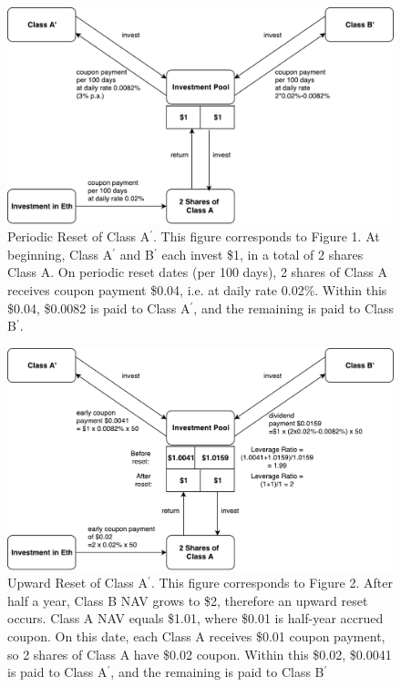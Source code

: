 \documentclass[10pt]{amsart}
\begin{document}
\begin{figure}
\includegraphics[width=\textwidth]{Ap_periodic.pdf}
\caption{Periodic Reset of Class A$^\prime$. This figure corresponds to Figure 1. At beginning, Class A$^\prime$ and B$^\prime$ each invest \$1, in a total of 2 shares Class A. On periodic reset dates (per 100 days), 2 shares of Class A receives coupon payment \$0.04, i.e. at daily rate 0.02\%. Within this \$0.04, \$0.0082 is paid to Class A$^\prime$, and the remaining is paid to Class B$^\prime$.}
\end{figure}

\begin{figure}
\includegraphics[width=\textwidth]{Ap_upward.pdf}
\caption{Upward Reset of Class A$^\prime$. This figure corresponds to Figure 2. After half a year, Class B NAV grows to \$2, therefore an upward reset occurs. Class A NAV equals \$1.01, where \$0.01 is half-year accrued coupon. On this date, each Class A receives \$0.01 coupon payment, so 2 shares of Class A have \$0.02 coupon. Within this \$0.02, \$0.0041 is paid to Class A$^\prime$, and the remaining is paid to Class B$^\prime$}
\end{figure}
\end{document}
